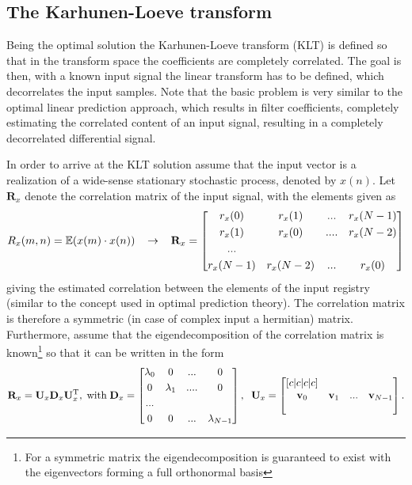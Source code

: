 \subsection{The Karhunen-Loeve transform}

Being the optimal solution the Karhunen-Loeve transform (KLT) is defined so that in the transform space the coefficients are completely correlated.
The goal is then, with a known input signal the linear transform has to be defined, which decorrelates the input samples.
Note that the basic problem is very similar to the optimal linear prediction approach, which results in filter coefficients, completely estimating the correlated content of an input signal, resulting in a completely decorrelated differential signal.

In order to arrive at the KLT solution assume that the input vector is a realization of a wide-sense stationary stochastic process, denoted by $x(n)$.
Let $\mathbf{R}_x$ denote the correlation matrix of the input signal, with the elements given as
\begin{equation}
R_x(m,n) = \operatorname{\mathbb{E}}( x(m) \cdot x(n) )
\hspace{3mm} \rightarrow \hspace{3mm}
\mathbf{R}_x = 
  \begin{bmatrix}
       r_x(0) & r_x(1) & ... & r_x(N-1) \\[0.3em]
       r_x(1) & r_x(0) & .... & r_x(N-2)\\[0.3em]
       ... \\[0.3em]
       r_x(N-1) & r_x(N-2) & ... & r_x(0)\end{bmatrix}
\end{equation}
giving the estimated correlation between the elements of the input registry (similar to the concept used in optimal prediction theory).
The correlation matrix is therefore a symmetric (in case of complex input a hermitian) matrix.
Furthermore, assume that the eigendecomposition of the correlation matrix is known\footnote{For a symmetric matrix the eigendecomposition is guaranteed to exist with the eigenvectors forming a full orthonormal basis} so that it can be written in the form
\begin{equation}
\mathbf{R}_x  = \mathbf{U}_x  \mathbf{D}_x  \mathbf{U}_x ^{\mathrm{T}}, \hspace{1mm} \text{with} \hspace{1mm}
\mathbf{D}_x  =   
\begin{bmatrix}
       \lambda_0 & 0 & ... & 0 \\[0.3em]
       0 & \lambda_1 & .... & 0\\[0.3em]
       ... \\[0.3em]
       0 & 0 & ... & \lambda_{N-1}\end{bmatrix},
       \hspace{2mm}
\mathbf{U}_x  =       \begin{bmatrix}[c|c|c|c]
      &   &  & \\
   \mathbf{v}_0 & \mathbf{v}_1 & ... & \mathbf{v}_{N-1} \\
     &   &   & \\
\end{bmatrix}.
\end{equation}
